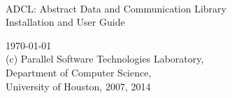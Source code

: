 \documentclass[11pt]{article}
\begin{document}
\begin{titlepage}
 \begin{center}
  \vfill
  {~}
  \vfill
  \vfill
  \vfill
  \vfill
  \vfill

    {\Large
      ADCL: Abstract Data and Communication Library \\
      Installation and User Guide \par}
  \vfill
  \today\\
  \vfill
     {\large (c) Parallel Software Technologies Laboratory, \\
       Department of Computer Science, \\
       University of Houston, 2007, 2014}\\
  \vfill
  \vfill
  \vfill
  \vfill
\end{center}                                                     
\end{titlepage}


\tableofcontents
\cleardoublepage


\pagewiselinenumbers




%


\end{document}
